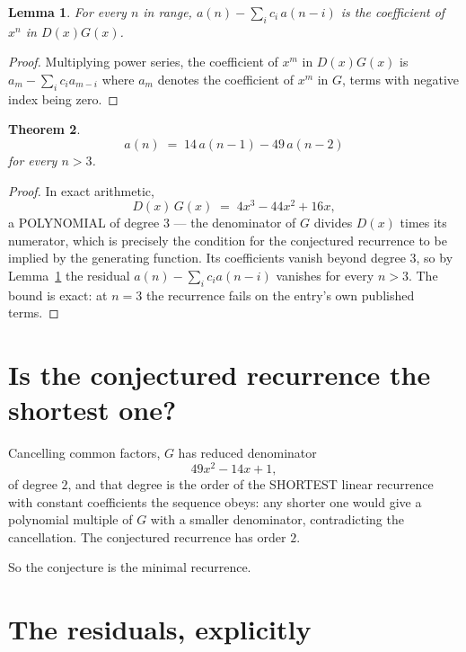 \documentclass[11pt,a4paper]{article}
\theoremstyle{plain}
\newtheorem{theorem}{Theorem}
\newtheorem{lemma}[theorem]{Lemma}
\theoremstyle{definition}
\begin{document}
\begin{lemma}\label{lem:key}
For every $n$ in range, $a(n)-\sum_i c_i\,a(n-i)$ is the coefficient of $x^{n}$ in
$D(x)G(x)$.
\end{lemma}

\begin{proof}
Multiplying power series, the coefficient of $x^{m}$ in $D(x)G(x)$ is
$a_m-\sum_i c_i a_{m-i}$ where $a_m$ denotes the coefficient of $x^{m}$ in $G$, terms with
negative index being zero.
\end{proof}

\begin{theorem}
\[
a(n)\;=\;14\,a(n-1) - 49\,a(n-2)
\]
for every $n>3$.
\end{theorem}

\begin{proof}
In exact arithmetic,
\[
D(x)\,G(x)\;=\;4 x^{3} - 44 x^{2} + 16 x,
\]
a POLYNOMIAL of degree $3$ --- the denominator of $G$ divides $D(x)$ times its numerator,
which is precisely the condition for the conjectured recurrence to be implied by the
generating function. Its coefficients vanish beyond degree $3$, so by
Lemma~\ref{lem:key} the residual $a(n)-\sum_ic_ia(n-i)$ vanishes for every
$n>3$. The bound is exact: at $n=3$ the recurrence fails on the entry's own published terms.
\end{proof}

\section{Is the conjectured recurrence the shortest one?}

Cancelling common factors, $G$ has reduced denominator
\[
49 x^{2} - 14 x + 1,
\]
of degree $2$, and that degree is the order of the SHORTEST linear recurrence with
constant coefficients the sequence obeys: any shorter one would give a polynomial multiple of
$G$ with a smaller denominator, contradicting the cancellation. The conjectured recurrence has
order $2$.

So the conjecture is the minimal recurrence.

\section{The residuals, explicitly}
\end{document}
